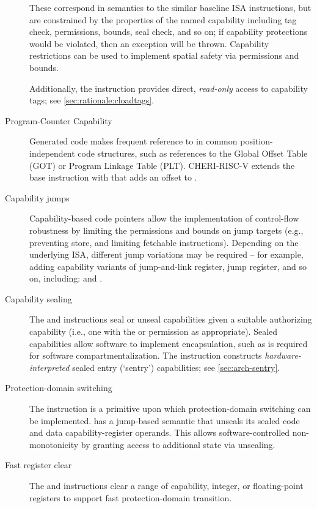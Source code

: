 \begin{description}
These correspond in semantics to the similar baseline ISA instructions, but
are constrained by the properties of the named capability including tag check,
permissions, bounds, seal check, and so on; if capability protections would be
violated, then an exception will be thrown.
Capability restrictions can be used to implement spatial safety via
permissions and bounds.

Additionally, the  instruction provides direct,
\emph{read-only} access to capability tags; see
\cref{sec:rationale:cloadtags}.

\item[Program-Counter Capability]
Generated code makes frequent reference to \PCC{} in common position-independent
code structures, such as references to the Global Offset Table (GOT) or
Program Linkage Table (PLT).
CHERI-RISC-V extends the base  instruction with
 that adds an offset to \PCC{}.

\item[Capability jumps]
Capability-based code pointers allow the implementation of control-flow
robustness by limiting the permissions and bounds on jump targets (e.g.,
preventing store, and limiting fetchable instructions).
Depending on the underlying ISA, different jump variations may be required --
for example, adding capability variants of jump-and-link register, jump
register, and so on, including:  and .

\item[Capability sealing]
The  and  instructions seal or
unseal capabilities given a suitable authorizing capability (i.e., one with
the \cappermSeal or \cappermUnseal permission as appropriate).
Sealed capabilities allow software to implement encapsulation, such as is
required for software compartmentalization.  The 
instruction constructs \emph{hardware-interpreted} sealed entry (`sentry')
capabilities; see \cref{sec:arch-sentry}.

\item[Protection-domain switching]
The  instruction is a
primitive upon which protection-domain switching can be implemented.
 has a jump-based semantic that
unseals its sealed code and data capability-register operands.
This allows software-controlled non-monotonicity by granting
access to additional state via unsealing.

\item[Fast register clear]
The  and  instructions clear a range of capability,
integer, or floating-point registers to support fast protection-domain
transition.


\end{description}
